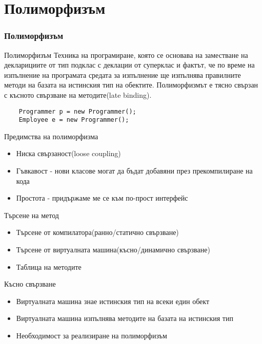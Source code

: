 \documentclass{beamer}
\begin{document}
\section{Полиморфизъм}


\begin{frame}[fragile]
  \frametitle{Полиморфизъм}
  \transdissolve
  \begin{block}{Полиморфизъм}
    Техника на програмиране, която се основава на заместване на
    декларициите от тип подклас с деклации от суперклас и фактът, че
    по време на изпълнение на програмата средата за изпълнение ще
    изпълнява правилните методи на базата на истинския тип на
    обектите. Полиморфизмът е тясно свързан с късното свързване на
    методите(late binding).
  \end{block}
  \begin{lstlisting}
    Programmer p = new Programmer();
    Employee e = new Programmer();
  \end{lstlisting}

\end{frame}

\begin{frame}{Предимства на полиморфизма}
  \transdissolve
  \begin{itemize}
  \item Ниска свързаност(loose coupling)
  \item Гъвкавост - нови класове могат да бъдат добавяни през
    прекомпилиране на кода
  \item Простота - придържаме ме се към по-прост интерфейс
  \end{itemize}
\end{frame}

\begin{frame}{Търсене на метод}
  \transdissolve
  \begin{itemize}
  \item Търсене от компилатора(ранно/статично свързване)
  \item Търсене от виртуалната машина(късно/динамично свързване)
  \item Таблица на методите
  \end{itemize}
\end{frame}

\begin{frame}{Късно свързване}
  \transdissolve
  \begin{itemize}
  \item Виртуалната машина знае истинския тип на всеки един обект
  \item Виртуалната машина изпълнява методите на базата на истинския
    тип
  \item Необходимост за реализиране на полиморфизъм
  \end{itemize}
\end{frame}
\end{document}
